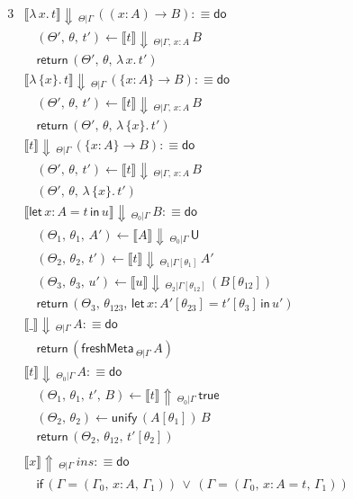 \documentclass[acmsmall,review,anonymous,prologue,dvipsnames]{acmart}\settopmatter{printfolios=true,printccs=false,printacmref=false}
\newcommand{\slet}{\boldsymbol{\mathsf{let}}}
\renewcommand{\sin}{\boldsymbol{\mathsf{in}}}
\renewcommand{\U}{\mathsf{U}}
\newcommand{\freshMeta}[3]{\mathsf{freshMeta}\,_{#1|#2}\,#3}
\newcommand{\unify}{\mathsf{unify}}
\newcommand{\echeck}[4]{\llbracket#1\rrbracket\!\Downarrow\,_{#2|#3}\,#4}
\newcommand{\einfer}[4]{\llbracket#1\rrbracket\!\Uparrow\,_{#3|#4}\,#2}
\newcommand{\edo}{\boldsymbol{\mathsf{do}}}
\newcommand{\ereturn}{\boldsymbol{\mathsf{return}}}
\newcommand{\eif}{\boldsymbol{\mathsf{if}}}
\newcommand{\true}{\mathsf{true}}
\theoremstyle{remark}
\begin{document}
\begingroup
\allowdisplaybreaks
\begin{alignat*}{3}
  &\echeck{\lambda\,x.\,t}{\Theta}{\Gamma}{((x : A)\to B)} :\equiv \edo \\
  &\quad(\Theta',\,\theta,\,t') \leftarrow \echeck{t}{\Theta}{\Gamma,\,x:A} B\\
  &\quad\ereturn\,(\Theta',\,\theta,\,\lambda\,x.\,t')\\
  &\echeck{\lambda\,\{x\}.\,t}{\Theta}{\Gamma}{(\{x : A\}\to B)} :\equiv \edo \\
  &\quad(\Theta',\,\theta,\,t') \leftarrow \echeck{t}{\Theta}{\Gamma,\,x:A} B\\
  &\quad\ereturn\,(\Theta',\,\theta,\,\lambda\,\{x\}.\,t')\\
  &\echeck{t}{\Theta}{\Gamma}{(\{x : A\}\to B)} : \equiv \edo \\
  &\quad (\Theta',\,\theta,\,t') \leftarrow \echeck{t}{\Theta}{\Gamma,\,x:A} B\\
  &\quad (\Theta',\,\theta,\,\lambda\,\{x\}.\,t')\\
  &\echeck{\slet\,x:A=t\,\sin\,u}{\Theta_0}{\Gamma}{B} :\equiv \edo \\
  &\quad(\Theta_1,\,\theta_1,\,A') \leftarrow \echeck{A}{\Theta_0}{\Gamma}{\U}\\
  &\quad(\Theta_2,\,\theta_2,\,t') \leftarrow \echeck{t}
                {\Theta_1}{\Gamma[\theta_1]}{A'}\\
  &\quad(\Theta_3,\,\theta_3,\,u') \leftarrow
                \echeck{u}{\Theta_2}{\Gamma[\theta_{12}]}{(B[\theta_{12}])}\\
  &\quad\ereturn\,(\Theta_3,\,\theta_{123},\,\slet\,x:A'[\theta_{23}]=t'[\theta_3]\,\sin\,u')\\
  &\echeck{\_}{\Theta}{\Gamma}{A} :\equiv \edo \\
  &\quad\ereturn\,(\freshMeta{\Theta}{\Gamma}{A})\\
  &\echeck{t}{\Theta_0}{\Gamma}{A} :\equiv \edo \\
  &\quad(\Theta_1,\,\theta_1,\,t',\,B) \leftarrow \einfer{t}{\true}{\Theta_0}{\Gamma}\\
  &\quad(\Theta_2,\,\theta_2) \leftarrow \unify\,(A[\theta_1])\,B\\
  &\quad\ereturn\,(\Theta_2,\,\theta_{12},\,t'[\theta_2])\\\\
  &\einfer{x}{ins}{\Theta}{\Gamma} :\equiv \edo\\
  &\quad\eif\,(\Gamma = (\Gamma_0,\,x : A,\,\Gamma_1))\,\lor\,(\Gamma = (\Gamma_0,\,x : A = t,\,\Gamma_1)) \\

\end{alignat*}
\end{document}
